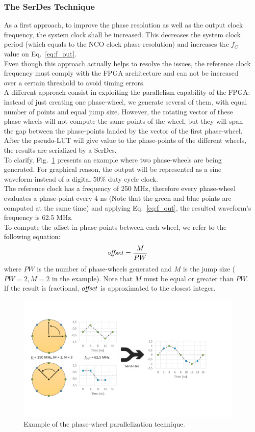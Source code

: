 \documentclass[11pt]{article}
\renewcommand{\>}{\rangle} \renewcommand{\emptyset}{\varnothing}
\begin{document}
\subsubsection{The SerDes Technique}
As a first approach, to improve the phase resolution as well as the output clock
frequency, the system clock shall be increased. This decreases the system clock
period (which equals to the NCO clock phase resolution) and increases the $f_C$
value on Eq.~\ref{eq:f_out}.\\
Even though this approach actually helps to resolve the issues, the reference
clock frequency must comply with the FPGA architecture and can not be increased
over a certain threshold to avoid timing errors.\\
A different approach consist in exploiting the parallelism capability of the
FPGA: instead of just creating one phase-wheel, we generate several of them,
with equal number of points and equal jump size. However, the rotating vector of
these phase-wheels will not compute the same points of the wheel, but they will
span the gap between the phase-points landed by the vector of the first
phase-wheel. After the pseudo-LUT will give value to the phase-points of the
different
wheels, the results are serialized by a SerDes.\\
To clarify, Fig.~\ref{fig:nco_horizontal} presents an example where two
phase-wheels are being generated. For graphical reason, the output will be
represented as a sine waveform instead of a digital 50\% duty cycle clock.\\
The reference clock has a frequency of 250 MHz, therefore every phase-wheel
evaluates a phase-point every 4 ns (Note that the green and blue points are
computed at the same time) and applying Eq.~\ref{eq:f_out}, the resulted
waveform's frequency is 62.5 MHz.\\
To compute the offset in phase-points between each wheel, we refer to the
following equation:
\begin{equation}
  \text{\textit{offset}} = \frac{M}{PW}
  \label{eq:offset}
\end{equation}
where $PW$ is the number of phase-wheels generated and $M$ is the jump size ($PW
= 2, M = 2$ in the example). Note that $M$ must be equal or greater than $PW$.
If the result is fractional, $\text{\textit{offset}}$ is approximated to the
closest integer.
\begin{figure}[h]
  \centerline{\includegraphics[width=0.9\linewidth]{images/nco_horizontal}}
  \caption{Example of the phase-wheel parallelization technique.}
  \label{fig:nco_horizontal}
\end{figure}
\end{document}
